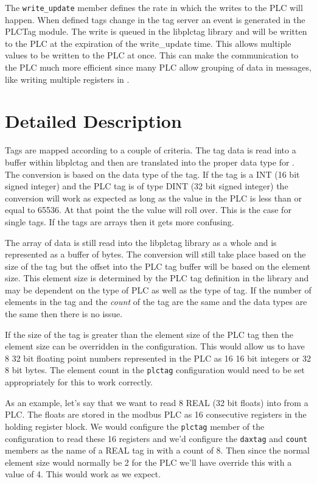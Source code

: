 The \texttt{write\_update} member defines the rate in which the writes
to the PLC will happen.  When defined tags change in the tag server an
event is generated in the PLCTag module.  The write is queued in the
libplctag library and will be written to the PLC at the expiration of
the write\_update time.  This allows multiple values to be written to
the PLC at once.  This can make the communication to the PLC much more
efficient since many PLC allow grouping of data in messages, like writing
multiple registers in \modbus{}.

\section{Detailed Description}

Tags are mapped according to a couple of criteria.  The tag data is
read into a buffer within libplctag and then are translated into the 
proper data type for \opendax{}.  The conversion is based on the data
type of the \opendax{} tag.  If the \opendax{} tag is a INT 
(16 bit signed integer) and the PLC tag is of type DINT (32 bit
signed integer) the conversion will work as expected as long as the
value in the PLC is less than or equal to 65536.  At that point the
the value will roll over.  This is the case for single tags.  If the
tags are arrays then it gets more confusing.

The array of data is still read into the libplctag library as a whole
and is represented as a buffer of bytes.  The conversion will still
take place based on the size of the \opendax{} tag but the offset into
the PLC tag buffer will be based on the element size.  This element
size is determined by the PLC tag definition in the library and may be
dependent on the type of PLC as well as the type of tag.  If the number
of elements in the tag and the \textit{count} of the \opendax{} tag are 
the same and the data types are the same then there is no issue.

If the size of the \opendax{} tag is greater than the element size of the
PLC tag then the element size can be overridden in the configuration.
This would allow us to have 8 32 bit floating point numbers represented
in the PLC as 16 16 bit integers or 32 8 bit bytes.  The element count
in the \texttt{plctag} configuration would need to be set appropriately
for this to work correctly.

As an example, let's say that we want to read 8 REAL (32 bit floats) into
\opendax{} from a \modbus{} PLC.  The floats are stored in the modbus PLC
as 16 consecutive registers in the holding register block.  We would
configure the \texttt{plctag} member of the configuration to read these
16 registers and we'd configure the \texttt{daxtag} and \texttt{count}
members as the name of a REAL tag in \opendax{} with a count of 8.  Then
since the normal element size would normally be 2 for the PLC we'll have
override this with a value of 4.  This would work as we expect.

